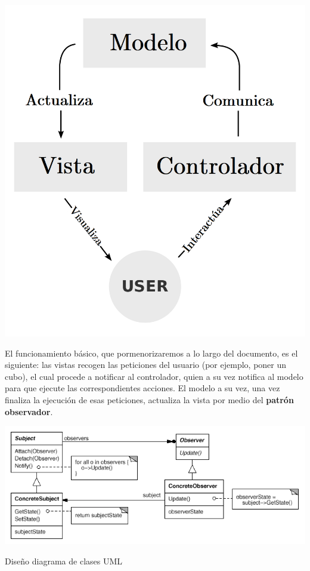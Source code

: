 \documentclass[../DocumentoOficial.tex]{subfiles}
\begin{document}
\begin{center}
\includegraphics[scale=0.2]{mvc.png}
\end{center}

El funcionamiento básico, que pormenorizaremos a lo largo del documento, es el siguiente: las vistas recogen las peticiones del usuario (por ejemplo, poner un cubo), el cual procede a notificar al controlador, quien a su vez notifica al modelo para que ejecute las correspondientes acciones. El modelo a su vez, una vez finaliza la ejecución de esas peticiones, actualiza la vista por medio del \textbf{patrón observador}.

\begin{center}
\includegraphics[scale=0.5]{observer1.png}

Diseño diagrama de clases UML
\end{center}
\end{document}
